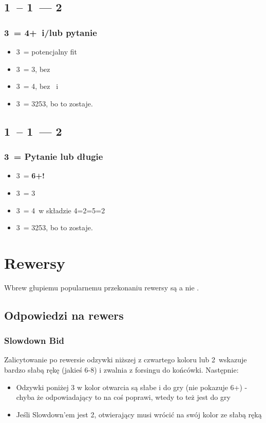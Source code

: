 \documentclass[12pt, a4paper]{article}
\begin{document}
\subsection*{1\clubs\ -- 1\hearts\ --- 2\ntx}
\subsubsection*{3\clubs\ = 4+\clubs\ i/lub pytanie}
\begin{itemize}
    \item 3\diams\ = potencjalny fit \clubs
    \item 3\hearts\ = 3\hearts, bez \clubs
    \item 3\spades\ = 4\spades, bez \hearts\ i \clubs
    \item 3\nt\ = 3253, bo to zostaje.
\end{itemize}

\subsection*{1\diams\ -- 1\hearts\ --- 2\ntx}
\subsubsection*{3\clubs\ = Pytanie lub długie \clubs}
\begin{itemize}
    \item 3\diams\ = \textbf{6+\diams!}
    \item 3\hearts\ = 3\hearts 
    \item 3\spades\ = 4\spades\ w składzie 4=2=5=2
    \item 3\nt\ = 3253, bo to zostaje.
\end{itemize}



\pagebreak
\section{Rewersy}
Wbrew głupiemu popularnemu przekonaniu rewersy są \fonce a nie \gf.
\subsection*{Odpowiedzi na rewers}
\subsubsection*{Slowdown Bid}
Zalicytowanie po rewersie odzywki niższej z czwartego koloru lub 2\nt\ wskazuje bardzo słabą rękę
(jakieś 6-8) i zwalnia z forsingu do końcówki. Następnie:
\begin{itemize}
    \item Odzywki poniżej 3 w kolor otwarcia są słabe i do gry (nie pokazuje 6+) - chyba że odpowiadający 
    to na coś poprawi, wtedy to też jest do gry 
    \item Jeśli Slowdown'em jest 2\nt, otwierający musi wrócić na swój kolor ze słabą ręką
\end{itemize}
\end{document}
